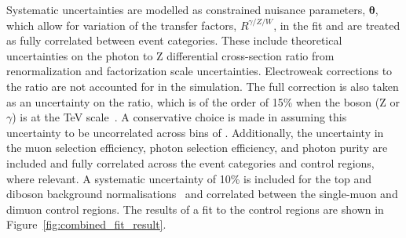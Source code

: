 Systematic uncertainties are modelled as constrained nuisance parameters, $\boldsymbol{\theta}$, which allow for variation of 
the transfer factors, $R^{\gamma/Z/W}$, in the fit and are treated as fully correlated between event categories.
These include theoretical uncertainties on the photon to Z differential cross-section ratio from renormalization and factorization scale uncertainties. 
Electroweak corrections to the ratio are not accounted for in the simulation. The full correction is also taken as an uncertainty on the ratio, 
which is of the order of 15\% when the boson (Z or $\gamma$) \pt is at the TeV scale~\cite{Kuhn:2005gv}. A conservative choice is made in assuming 
this uncertainty to be uncorrelated across bins of \ETm. Additionally, the uncertainty in the muon selection efficiency, photon selection efficiency, 
and photon purity are included and fully correlated across the event categories and control regions, where relevant. A systematic uncertainty of 10\% 
is included for the top and diboson background normalisations~\cite{tagkey2015250} and correlated between the single-muon and dimuon control regions. The results of a fit to the control regions are shown in Figure~\ref{fig:combined_fit_result}.
 
